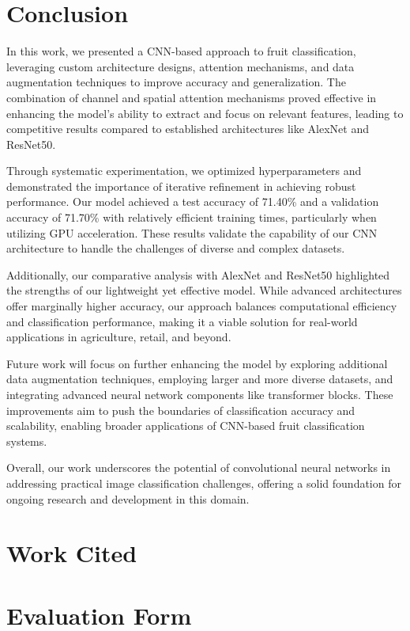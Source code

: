 \documentclass{article}
\begin{document}
\section{Conclusion}

In this work, we presented a CNN-based approach to fruit classification, leveraging custom architecture designs, attention mechanisms, and data augmentation techniques to improve accuracy and generalization. The combination of channel and spatial attention mechanisms proved effective in enhancing the model's ability to extract and focus on relevant features, leading to competitive results compared to established architectures like AlexNet and ResNet50.

Through systematic experimentation, we optimized hyperparameters and demonstrated the importance of iterative refinement in achieving robust performance. Our model achieved a test accuracy of 71.40\% and a validation accuracy of 71.70\% with relatively efficient training times, particularly when utilizing GPU acceleration. These results validate the capability of our CNN architecture to handle the challenges of diverse and complex datasets.

Additionally, our comparative analysis with AlexNet and ResNet50 \cite{he2016deep} highlighted the strengths of our lightweight yet effective model. While advanced architectures offer marginally higher accuracy, our approach balances computational efficiency and classification performance, making it a viable solution for real-world applications in agriculture, retail, and beyond.

Future work will focus on further enhancing the model by exploring additional data augmentation techniques, employing larger and more diverse datasets, and integrating advanced neural network components like transformer blocks. These improvements aim to push the boundaries of classification accuracy and scalability, enabling broader applications of CNN-based fruit classification systems.

Overall, our work underscores the potential of convolutional neural networks in addressing practical image classification challenges, offering a solid foundation for ongoing research and development in this domain.

\section{Work Cited}




\section{Evaluation Form}
\end{document}
